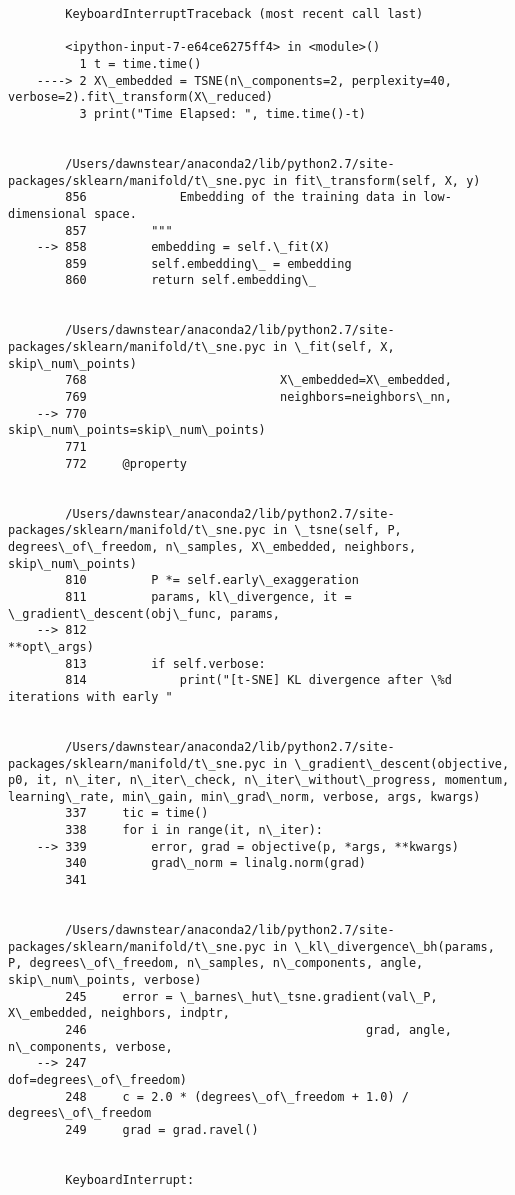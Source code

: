 \documentclass[11pt]{article}
\begin{document}
    \begin{Verbatim}[commandchars=\\\{\}]

        

        KeyboardInterruptTraceback (most recent call last)

        <ipython-input-7-e64ce6275ff4> in <module>()
          1 t = time.time()
    ----> 2 X\_embedded = TSNE(n\_components=2, perplexity=40, verbose=2).fit\_transform(X\_reduced)
          3 print("Time Elapsed: ", time.time()-t)


        /Users/dawnstear/anaconda2/lib/python2.7/site-packages/sklearn/manifold/t\_sne.pyc in fit\_transform(self, X, y)
        856             Embedding of the training data in low-dimensional space.
        857         """
    --> 858         embedding = self.\_fit(X)
        859         self.embedding\_ = embedding
        860         return self.embedding\_


        /Users/dawnstear/anaconda2/lib/python2.7/site-packages/sklearn/manifold/t\_sne.pyc in \_fit(self, X, skip\_num\_points)
        768                           X\_embedded=X\_embedded,
        769                           neighbors=neighbors\_nn,
    --> 770                           skip\_num\_points=skip\_num\_points)
        771 
        772     @property


        /Users/dawnstear/anaconda2/lib/python2.7/site-packages/sklearn/manifold/t\_sne.pyc in \_tsne(self, P, degrees\_of\_freedom, n\_samples, X\_embedded, neighbors, skip\_num\_points)
        810         P *= self.early\_exaggeration
        811         params, kl\_divergence, it = \_gradient\_descent(obj\_func, params,
    --> 812                                                       **opt\_args)
        813         if self.verbose:
        814             print("[t-SNE] KL divergence after \%d iterations with early "


        /Users/dawnstear/anaconda2/lib/python2.7/site-packages/sklearn/manifold/t\_sne.pyc in \_gradient\_descent(objective, p0, it, n\_iter, n\_iter\_check, n\_iter\_without\_progress, momentum, learning\_rate, min\_gain, min\_grad\_norm, verbose, args, kwargs)
        337     tic = time()
        338     for i in range(it, n\_iter):
    --> 339         error, grad = objective(p, *args, **kwargs)
        340         grad\_norm = linalg.norm(grad)
        341 


        /Users/dawnstear/anaconda2/lib/python2.7/site-packages/sklearn/manifold/t\_sne.pyc in \_kl\_divergence\_bh(params, P, degrees\_of\_freedom, n\_samples, n\_components, angle, skip\_num\_points, verbose)
        245     error = \_barnes\_hut\_tsne.gradient(val\_P, X\_embedded, neighbors, indptr,
        246                                       grad, angle, n\_components, verbose,
    --> 247                                       dof=degrees\_of\_freedom)
        248     c = 2.0 * (degrees\_of\_freedom + 1.0) / degrees\_of\_freedom
        249     grad = grad.ravel()


        KeyboardInterrupt: 

    \end{Verbatim}
\end{document}
